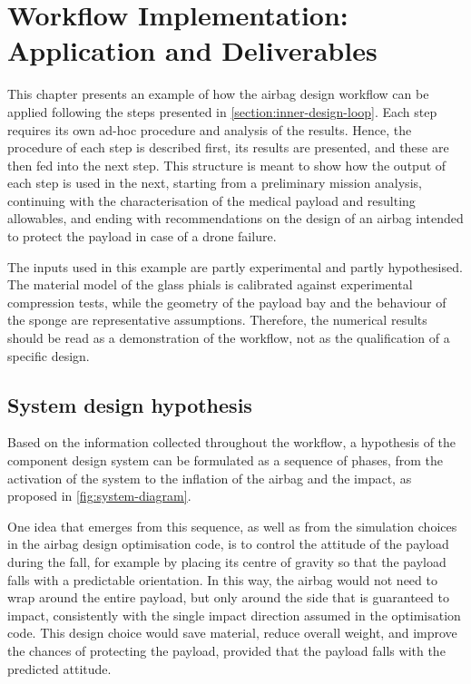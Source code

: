 \chapter{Workflow Implementation: Application and Deliverables}
\label{chapter:results}

This chapter presents an example of how the airbag design workflow can be applied following the steps presented in \cref{section:inner-design-loop}. Each step requires its own ad-hoc procedure and analysis of the results. Hence, the procedure of each step is described first, its results are presented, and these are then fed into the next step. This structure is meant to show how the output of each step is used in the next, starting from a preliminary mission analysis, continuing with the characterisation of the medical payload and resulting allowables, and ending with recommendations on the design of an airbag intended to protect the payload in case of a drone failure.

The inputs used in this example are partly experimental and partly hypothesised. The material model of the glass phials is calibrated against experimental compression tests, while the geometry of the payload bay and the behaviour of the sponge are representative assumptions. Therefore, the numerical results should be read as a demonstration of the workflow, not as the qualification of a specific design.












\section{System design hypothesis}\label{sec:system-design-hypothesis}
Based on the information collected throughout the workflow, a hypothesis of the component design system can be formulated as a sequence of phases, from the activation of the system to the inflation of the airbag and the impact, as proposed in \cref{fig:system-diagram}.

One idea that emerges from this sequence, as well as from the simulation choices in the airbag design optimisation code, is to control the attitude of the payload during the fall, for example by placing its centre of gravity so that the payload falls with a predictable orientation. In this way, the airbag would not need to wrap around the entire payload, but only around the side that is guaranteed to impact, consistently with the single impact direction assumed in the optimisation code. This design choice would save material, reduce overall weight, and improve the chances of protecting the payload, provided that the payload falls with the predicted attitude.

